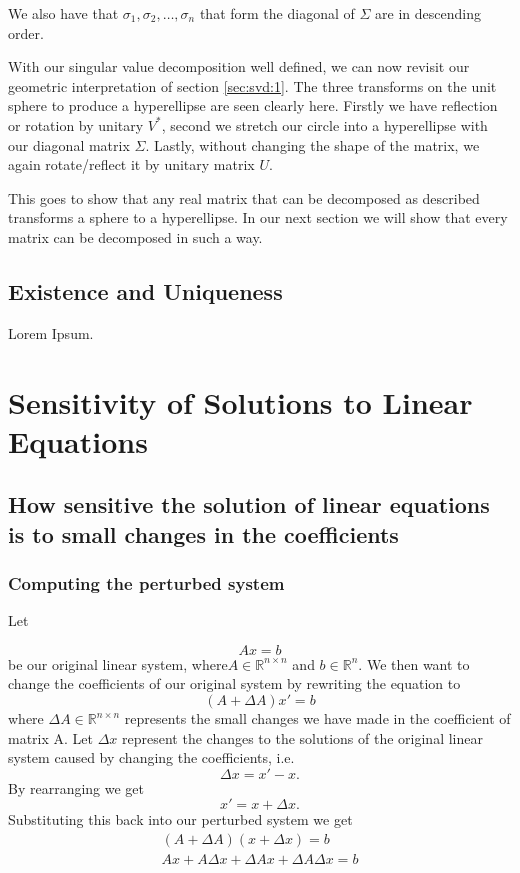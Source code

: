 \documentclass[12pt,reqno,twoside,titlepage]{article}
\theoremstyle{definition}
\begin{document}
We also have that $\sigma_1, \sigma_2, \dots, \sigma_n$ that form the diagonal of $\Sigma$ are in descending order.

With our singular value decomposition well defined, we can now revisit our geometric interpretation of section \ref{sec:svd:1}. The three transforms on the unit sphere to produce a hyperellipse are seen clearly here. Firstly we have reflection or rotation by unitary $V^*$, second we stretch our circle into a hyperellipse with our diagonal matrix $\Sigma$. Lastly, without changing the shape of the matrix, we again rotate/reflect it by unitary matrix $U$.

This goes to show that any real matrix that can be decomposed as described transforms a sphere to a hyperellipse. In our next section we will show that every matrix can be decomposed in such a way.
\subsection{Existence and Uniqueness}
\label{sec:svd:3}

Lorem Ipsum.

\section{Sensitivity of Solutions to Linear Equations}
\label{sec:ssl}
\subsection{How sensitive the solution of linear equations is to small changes in the coefficients }
\subsubsection{Computing the perturbed system}
Let

$$Ax=b$$
be our original linear system, where$A\in\mathbb{R}^{n\times n}$ and $b\in\mathbb{R}^n$.
\newline
We then want to change the coefficients of our original system by rewriting the equation to
$$(A+\Delta A)x'=b$$
where $\Delta A\in \mathbb{R}^{n\times n}$ represents the small changes we have made in the coefficient of matrix A.
\newline
Let $\Delta x$ represent the changes to the solutions of the original linear system caused by changing the coefficients, i.e. 
$$\Delta x=x'-x.$$
\newline 
By rearranging we get
$$x'=x+\Delta x.$$
Substituting this back into our perturbed system we get
\begin{align*}
(A+\Delta A)(x+\Delta x)= b\\
Ax+A\Delta x+\Delta A x+\Delta A\Delta x=b
\end{align*}
\end{document}
